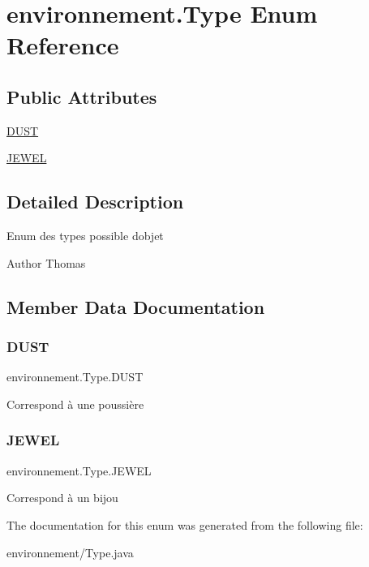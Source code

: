 \hypertarget{enumenvironnement_1_1_type}{}\section{environnement.\+Type Enum Reference}
\label{enumenvironnement_1_1_type}
\subsection*{Public Attributes}
\begin{DoxyCompactItemize}
\item 
\hyperlink{enumenvironnement_1_1_type_a1e69fa75f3320089da9616bcbd4c213f}{D\+U\+ST}
\item 
\hyperlink{enumenvironnement_1_1_type_a3bbca3efc63d402d324b7a3fa7f5e892}{J\+E\+W\+EL}
\end{DoxyCompactItemize}


\subsection{Detailed Description}
Enum des types possible d\textquotesingle{}objet \begin{DoxyAuthor}{Author}
Thomas 
\end{DoxyAuthor}


\subsection{Member Data Documentation}
\hypertarget{enumenvironnement_1_1_type_a1e69fa75f3320089da9616bcbd4c213f}{}\label{enumenvironnement_1_1_type_a1e69fa75f3320089da9616bcbd4c213f} 
\subsubsection{\texorpdfstring{D\+U\+ST}{DUST}}
{\footnotesize\ttfamily environnement.\+Type.\+D\+U\+ST}

Correspond à une poussière \hypertarget{enumenvironnement_1_1_type_a3bbca3efc63d402d324b7a3fa7f5e892}{}\label{enumenvironnement_1_1_type_a3bbca3efc63d402d324b7a3fa7f5e892} 
\subsubsection{\texorpdfstring{J\+E\+W\+EL}{JEWEL}}
{\footnotesize\ttfamily environnement.\+Type.\+J\+E\+W\+EL}

Correspond à un bijou 

The documentation for this enum was generated from the following file\+:\begin{DoxyCompactItemize}
\item 
environnement/Type.\+java\end{DoxyCompactItemize}
